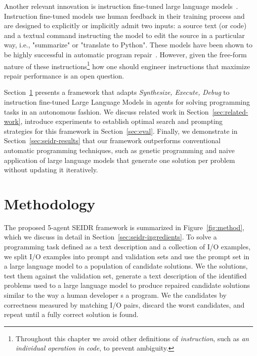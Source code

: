 Another relevant innovation is instruction fine-tuned large language models~\cite{ouyang2022:training}. Instruction fine-tuned models use human feedback in their training process and are designed to explicitly or implicitly admit two inputs: a source text (or code) and a textual command instructing the model to edit the source in a particular way, i.e., "summarize" or "translate to Python".
These models have been shown to be highly successful in automatic program repair~\cite{fanAutomatedRepairPrograms2023}. 
However, given the free-form nature of these instructions\footnote{Throughout this chapter we avoid other definitions of \emph{instruction}, such as \emph{an individual operation in code}, to prevent ambiguity.} how one should engineer instructions that maximize repair performance is an open question. 

Section~\ref{sec:seidr-methodology} presents a framework that adapts \emph{Synthesize, Execute, Debug} to instruction fine-tuned Large Language Models in agents for solving programming tasks in an autonomous fashion. 
We discuss related work in Section~\ref{sec:related-work}, introduce experiments to establish optimal search and prompting strategies for this framework in Section~\ref{sec:eval}. 
Finally, we demonstrate in Section~\ref{sec:seidr-results} that our framework outperforms conventional automatic programming techniques, such as genetic programming and naive application of large language models that generate one solution per problem without updating it iteratively. 

\newpage
\section{Methodology}
\label{sec:seidr-methodology}
The proposed 5-agent SEIDR framework  is summarized in Figure~\ref{fig:method}, which we discuss in detail in Section~\ref{sec:seidr-ingredients}.
To solve a programming task defined as a text description and a collection of I/O examples, we split I/O examples into prompt and validation sets and use the prompt set in a large language model to \synthesize{} a population of candidate solutions.
We \execute{} the solutions, test them against the validation set, generate a text description of the identified problems used to \instruct{} a large language model to produce repaired candidate solutions similar to the way a human developer \debug{}s a program.
We \rank{} the candidates
by correctness measured by matching I/O pairs, discard the worst candidates, and repeat until a fully correct solution is found.

